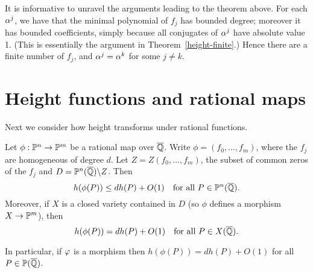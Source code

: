 \begin{rem}
It is informative to unravel the arguments leading to the theorem above. For each $\alpha^j$, we have that the minimal polynomial of $f_j$ has bounded degree; moreover it has bounded coefficients, simply because all conjugates of $\alpha^j$ have absolute value 1. (This is essentially the argument in Theorem~\ref{height-finite}.) Hence there are a finite number of $f_j$, and $\alpha^j=\alpha^k$ for some $j\ne k$.
\end{rem}
\section{Height functions and rational maps}
Next we consider how height transforms under rational functions.
\begin{thm}\label{height-under-rational-maps}
Let $\phi:\mathbb{P}^n\to \mathbb{P}^m$ be a rational map over $\overline{\mathbb{Q}}$. Write $\phi=(f_0,\ldots, f_m)$, where the $f_j$ are homogeneous of degree $d$. Let $Z=Z(f_0,\ldots, f_m)$, the subset of common zeros of the $f_j$ and $D=\mathbb{P}^n(\overline{\mathbb{Q}})\backslash Z$. Then
\[
h(\phi(P))\le dh(P)+O(1)\quad \text{for all }P\in \mathbb{P}^n(\overline{\mathbb{Q}}).
\]
Moreover, if $X$ is a closed variety contained in $D$ (so $\phi$ defines a morphism $X\to \mathbb{P}^m$), then 
\begin{equation}\label{height-degree}
h(\phi(P))= dh(P)+O(1)\quad \text{for all }P\in X(\overline{\mathbb{Q}}).
\end{equation}
\end{thm}
In particular, if $\varphi$ is a morphism then $h(\phi(P))=dh(P)+O(1)$ for all $P\in \mathbb{P}(\overline{\mathbb{Q}})$.
